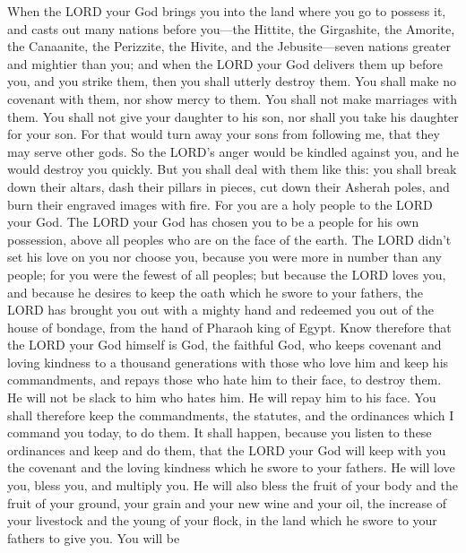  When the LORD your God brings you into the land where you
go to possess it, and casts out many nations before you---the Hittite,
the Girgashite, the Amorite, the Canaanite, the Perizzite, the Hivite,
and the Jebusite---seven nations greater and mightier than you;
 and when the LORD your God delivers them up before you,
and you strike them, then you shall utterly destroy them. You shall make
no covenant with them, nor show mercy to them.  You shall
not make marriages with them. You shall not give your daughter to his
son, nor shall you take his daughter for your son.  For
that would turn away your sons from following me, that they may serve
other gods. So the LORD's anger would be kindled against you, and he
would destroy you quickly.  But you shall deal with them
like this: you shall break down their altars, dash their pillars in
pieces, cut down their Asherah poles, and burn their engraved images
with fire.  For you are a holy people to the LORD your
God. The LORD your God has chosen you to be a people for his own
possession, above all peoples who are on the face of the earth.
 The LORD didn't set his love on you nor choose you,
because you were more in number than any people; for you were the fewest
of all peoples;  but because the LORD loves you, and
because he desires to keep the oath which he swore to your fathers, the
LORD has brought you out with a mighty hand and redeemed you out of the
house of bondage, from the hand of Pharaoh king of Egypt. 
Know therefore that the LORD your God himself is God, the faithful God,
who keeps covenant and loving kindness to a thousand generations with
those who love him and keep his commandments,  and repays
those who hate him to their face, to destroy them. He will not be slack
to him who hates him. He will repay him to his face.  You
shall therefore keep the commandments, the statutes, and the ordinances
which I command you today, to do them.  It shall happen,
because you listen to these ordinances and keep and do them, that the
LORD your God will keep with you the covenant and the loving kindness
which he swore to your fathers.  He will love you, bless
you, and multiply you. He will also bless the fruit of your body and the
fruit of your ground, your grain and your new wine and your oil, the
increase of your livestock and the young of your flock, in the land
which he swore to your fathers to give you.  You will be
